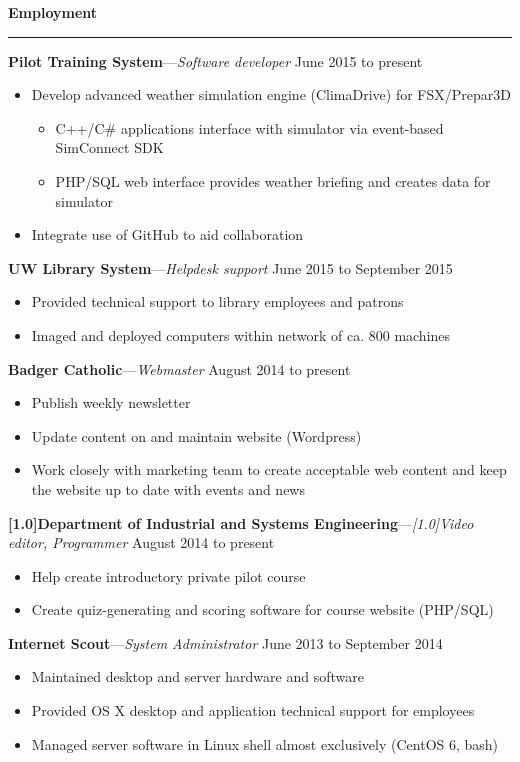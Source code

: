 \documentclass[12pt,letterpaper]{article}
\newenvironment{details}{
    \vspace{-.8em}
    \begin{itemize}
        \renewcommand \labelitemi{\labelitemiv}
        \setlength{\itemsep}{0pt}
        \setlength{\parskip}{-1pt}
        \setlength{\parsep}{0pt}
    }{
    \end{itemize}
    \vspace{-.5em}
}
\newcommand{\hr} {
    \vspace{-1em}
    \par\rule{\textwidth}{1pt}
    \vspace{-1.5em}
}
\newcommand{\ressection}[1] {
    \par{\large \textbf{#1}}
    \hr
}
\newenvironment{employment} {
    \setlength{\parskip}{0pt}
    \ressection{Employment}
}{
    \vspace{0.5em}
}
\newcommand{\employer}[3] {
    \vspace{3pt}
    {\par\textbf{#1}---\textit{#2} \hfill #3}
    \par
}
\begin{document}
\begin{employment} 

\employer{Pilot Training System}{Software developer}{June 2015 to present}
\begin{details}
    \item Develop advanced weather simulation engine (ClimaDrive) for FSX/Prepar3D
    \vspace{.5em}
    \begin{details}
        \item C++/C\# applications interface with simulator via event-based SimConnect SDK
        \item PHP/SQL web interface provides weather briefing and creates data for simulator
    \end{details}
    \item Integrate use of GitHub to aid collaboration
\end{details}

\employer{UW Library System}{Helpdesk support}{June 2015 to September 2015}
\begin{details}
    \item Provided technical support to library employees and patrons
    \item Imaged and deployed computers within network of ca. 800 machines
\end{details}

\employer{Badger Catholic}{Webmaster}{August 2014 to present}
\begin{details}
    \item Publish weekly newsletter
    \item Update content on and maintain website (Wordpress)
    \item Work closely with marketing team to create acceptable web content and keep the website up to date with events and news
\end{details}

\employer{\scalebox{.9}[1.0]{Department of Industrial and Systems Engineering}}{\scalebox{.9}[1.0]{Video editor, Programmer}}{August 2014 to present}
\begin{details}
    \item Help create introductory private pilot course
    \item Create quiz-generating and scoring software for course website (PHP/SQL)
\end{details}

\employer{Internet Scout}{System Administrator}{June 2013 to September 2014}
\begin{details}
    \item Maintained desktop and server hardware and software
    \item Provided OS X desktop and application technical support for employees
    \item Managed server software in Linux shell almost exclusively (CentOS 6, bash)
\end{details}

\end{employment}
\end{document}

